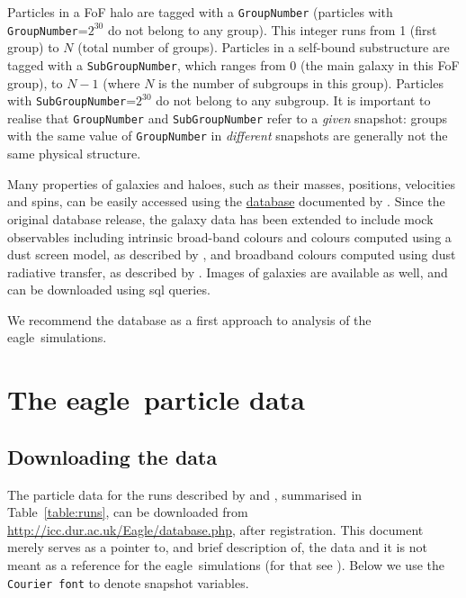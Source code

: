 \documentclass[10pt, a4paper]{article}
\newcommand{\eagle}{{\sc eagle}}
\begin{document}
Particles in a FoF halo are tagged with a \texttt{GroupNumber} (particles with
\texttt{GroupNumber}=$2^{30}$ do not belong to any group). This integer runs
from 1 (first group) to $N$ (total number of groups). Particles in a self-bound
substructure are tagged with a \texttt{SubGroupNumber}, which ranges from 0
(the main galaxy in this FoF group), to $N-1$ (where $N$ is the number of
subgroups in this group).  Particles with \texttt{SubGroupNumber}=$2^{30}$ do
not belong to any subgroup.  It is important to realise that
\texttt{GroupNumber} and \texttt{SubGroupNumber} refer to a {\em given}
snapshot: groups with the same value of \texttt{GroupNumber} in {\em different}
snapshots are generally not the same physical structure.

Many properties of galaxies and haloes, such as their masses, positions,
velocities and spins, can be easily accessed using the {\color{blue}{\sc sql}
\href{http://icc.dur.ac.uk/Eagle/database.php}{database}} documented by
\cite{mcalpine2016}. Since the original database release, the galaxy data has
been extended to include mock observables including intrinsic broad-band
colours and colours computed using a dust screen model, as described by
\cite{trayford15}, and broadband colours computed using dust radiative
transfer, as described by \cite{camps16, trayford17}. Images of galaxies are
available as well, and can be downloaded using {\sc sql} queries. 

We recommend the database as a first approach to analysis of the \eagle\ simulations. 

\section{The \eagle\ particle data} \label{sect:eagle_pdata}
\subsection{Downloading the data}
The particle data for the runs described by \cite{schaye2015} and
\cite{crain2015}, summarised in Table~\ref{table:runs}, can be downloaded from
{\color{blue} \url{http://icc.dur.ac.uk/Eagle/database.php}}, after
registration. This document merely serves as a pointer to, and brief
description of, the data and it is not meant as a reference for the \eagle\
simulations (for that see \cite{schaye2015,crain2015}). Below we use the
\texttt{Courier font} to denote snapshot variables.
\end{document}
